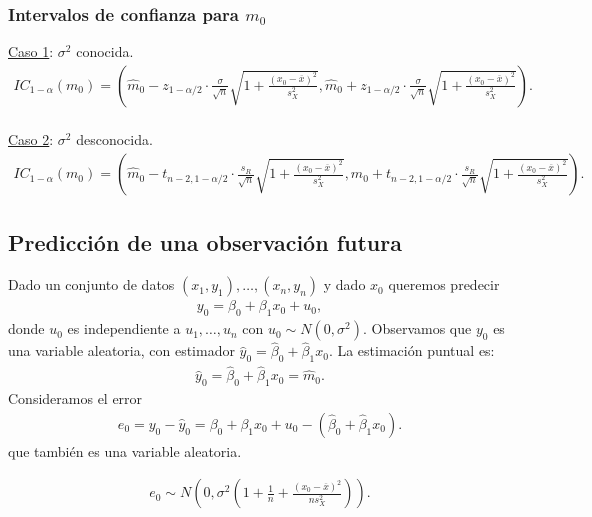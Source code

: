 \subsubsection{Intervalos de confianza para $m_0$}
\noindent \underline{Caso 1}: $\sigma^2$ conocida.
\begin{align*}
    IC_{1-\alpha}(m_0) = \left( \widehat{m}_0 - z_{1-\alpha/2} \cdot \frac{\sigma}{\sqrt{n}} \sqrt{1 + \frac{(x_0 - \overline{x})^2}{s_X^2}}, \widehat{m}_0 + z_{1-\alpha/2} \cdot \frac{\sigma}{\sqrt{n}} \sqrt{1 + \frac{(x_0 - \overline{x})^2}{s_X^2}} \right).
\end{align*}
\\
\newline
\noindent \underline{Caso 2}: $\sigma^2$ desconocida.
\begin{align*}
    IC_{1-\alpha}(m_0) = \left( \widehat{m}_0 - t_{n-2,1-\alpha/2} \cdot \frac{s_R}{\sqrt{n}} \sqrt{1 + \frac{(x_0 - \overline{x})^2}{s_X^2}}, \widehat{m}_0 + t_{n-2,1-\alpha/2} \cdot \frac{s_R}{\sqrt{n}} \sqrt{1 + \frac{(x_0 - \overline{x})^2}{s_X^2}} \right).
\end{align*}

\subsection{Predicción de una observación futura}
\noindent Dado un conjunto de datos $(x_1, y_1), \dots, (x_n, y_n)$ y dado $x_0$ queremos predecir
\begin{align*}
    y_0 = \beta_0 + \beta_1 x_0 + u_0,
\end{align*}
donde $u_0$ es independiente a $u_1, \dots, u_n$ con $u_0 \sim N(0, \sigma^2)$. Observamos que $y_0$ es una variable aleatoria, con estimador $\widehat{y}_0 = \widehat{\beta}_0 + \widehat{\beta}_1x_0$. La estimación puntual es:
\begin{align*}
    \widehat{y}_0 = \widehat{\beta}_0 + \hat{\beta}_1x_0 = \widehat{m}_0.
\end{align*}
Consideramos el error
\begin{align*}
    e_0 = y_0 - \widehat{y}_0 = \beta_0 + \beta_1x_0 + u_0 - (\widehat{\beta}_0 + \widehat{\beta}_1x_0).
\end{align*}
que también es una variable aleatoria.
\begin{teo}
    \begin{align*}
        e_0 \sim N \left( 0, \sigma^2 \left(1+\frac{1}{n}+\frac{(x_0-\overline{x})^2}{ns_X^2} \right) \right).
    \end{align*}
\end{teo}

